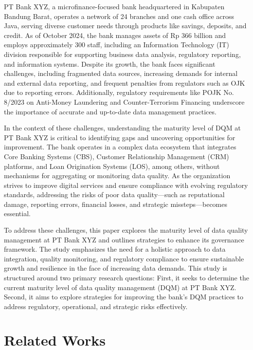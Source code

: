 \documentclass[conference]{IEEEtran}
\begin{document}
PT Bank XYZ, a microfinance-focused bank headquartered in Kabupaten Bandung Barat, operates a network of 24 branches and one cash office across Java, serving diverse customer needs through products like savings, deposits, and credit. As of October 2024, the bank manages assets of Rp 366 billion and employs approximately 300 staff, including an Information Technology (IT) division responsible for supporting business data analysis, regulatory reporting, and information systems. Despite its growth, the bank faces significant challenges, including fragmented data sources, increasing demands for internal and external data reporting, and frequent penalties from regulators such as OJK due to reporting errors. Additionally, regulatory requirements like POJK No. 8/2023 on Anti-Money Laundering and Counter-Terrorism Financing underscore the importance of accurate and up-to-date data management practices.

In the context of these challenges, understanding the maturity level of DQM at PT Bank XYZ is critical to identifying gaps and uncovering opportunities for improvement. The bank operates in a complex data ecosystem that integrates Core Banking Systems (CBS), Customer Relationship Management (CRM) platforms, and Loan Origination Systems (LOS), among others, without mechanisms for aggregating or monitoring data quality. As the organization strives to improve digital services and ensure compliance with evolving regulatory standards, addressing the risks of poor data quality—such as reputational damage, reporting errors, financial losses, and strategic missteps—becomes essential.

To address these challenges, this paper explores the maturity level of data quality management at PT Bank XYZ and outlines strategies to enhance its governance framework. The study emphasizes the need for a holistic approach to data integration, quality monitoring, and regulatory compliance to ensure sustainable growth and resilience in the face of increasing data demands. This study is structured around two primary research questions: First, it seeks to determine the current maturity level of data quality management (DQM) at PT Bank XYZ. Second, it aims to explore strategies for improving the bank’s DQM practices to address regulatory, operational, and strategic risks effectively.


\section{Related Works}
\end{document}
